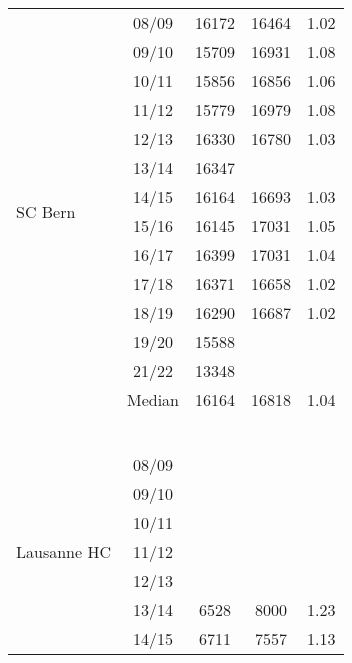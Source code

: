 \begin{longtable}[c]{p{5cm}cccc}
    \multirow[t]{14}{=}{SC Bern}  & 08/09 & 16172 & 16464 & 1.02 \\ 
                                 & 09/10 & 15709 & 16931 & 1.08 \\ 
                                 & 10/11 & 15856 & 16856 & 1.06 \\ 
                                 & 11/12 & 15779 & 16979 & 1.08 \\ 
                                 & 12/13 & 16330 & 16780 & 1.03 \\ 
                                 & 13/14 & 16347 & ~ & ~ \\ 
                                 & 14/15 & 16164 & 16693 & 1.03 \\ 
                                 & 15/16 & 16145 & 17031 & 1.05 \\ 
                                 & 16/17 & 16399 & 17031 & 1.04 \\ 
                                 & 17/18 & 16371 & 16658 & 1.02 \\ 
                                 & 18/19 & 16290 & 16687 & 1.02 \\ 
                                 & 19/20 & 15588 & ~ & ~ \\ 
                                 & 21/22 & 13348 & ~ & ~ \\ 
                                 \cmidrule{2-5}
                                 & Median & 16164 & 16818 & 1.04 \\
    \cmidrule{1-5}
    \multicolumn{5}{c}{} \\
    \multicolumn{5}{c}{} \\
    \multicolumn{5}{c}{} \\
    \multicolumn{5}{c}{} \\ 
    \multicolumn{5}{c}{} \\
    \multicolumn{5}{c}{} \\ 
    \multirow[t]{14}{=}{Lausanne HC} & 08/09 & ~ & ~ & ~ \\ 
                                    & 09/10 & ~ & ~ & ~ \\ 
                                    & 10/11 & ~ & ~ & ~ \\ 
                                    & 11/12 & ~ & ~ & ~ \\ 
                                    & 12/13 & ~ & ~ & ~ \\ 
                                    & 13/14 & 6528 & 8000 & 1.23 \\ 
                                    & 14/15 & 6711 & 7557 & 1.13 \\ 

\end{longtable}
